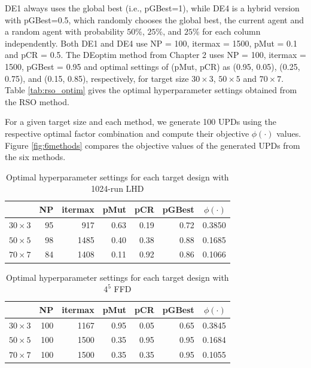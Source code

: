 \documentclass [PhD] {package/uclathes}
\begin{document}
DE1 always uses the global best (i.e., pGBest=1), while DE4 is a hybrid version with pGBest=0.5, which randomly chooses the global best, the current agent and a random agent with probability $50$\%, $25$\%, and $25$\% for each column independently. Both DE1 and DE4 use NP = 100, itermax = 1500, pMut = 0.1 and pCR = 0.5. The DEoptim method from Chapter 2 uses  NP = 100, itermax = 1500, pGBest = 0.95 and optimal settings of (pMut, pCR) as (0.95, 0.05), (0.25, 0.75), and (0.15, 0.85), respectively, for target size $30\times3$, $50\times5$ and $70\times7$. Table \ref{tab:rso_optim} gives the optimal hyperparameter settings obtained from  the RSO method.


For a given target size and each method, we generate 100 UPDs using the respective optimal factor combination and compute their objective $\phi(\cdot)$ values.  Figure \ref{fig:6methods} compares the objective values of the generated UPDs from the six methods.


\begin{table}

\caption{\label{tab:lhd_optim}Optimal hyperparameter settings for each target design with 1024-run LHD}
\centering
\begin{tabular}[t]{l|r|r|r|r|r|r}
\hline
  & NP & itermax & pMut & pCR & pGBest & $\phi(\cdot)$\\
\hline
$30\times3$ & 95 & 917 & 0.63 & 0.19 & 0.72 & 0.3850\\
\hline
$50\times5$ & 98 & 1485 & 0.40 & 0.38 & 0.88 & 0.1685\\
\hline
$70\times7$ & 84 & 1408 & 0.11 & 0.92 & 0.86 & 0.1066\\
\hline
\end{tabular}
\end{table}\begin{table}

\caption{\label{tab:grid_optim}Optimal hyperparameter settings for each target design with $4^5$ FFD}
\centering
\begin{tabular}[t]{l|r|r|r|r|r|r}
\hline
  & NP & itermax & pMut & pCR & pGBest & $\phi(\cdot)$\\
\hline
$30\times3$ & 100 & 1167 & 0.95 & 0.05 & 0.65 & 0.3845\\
\hline
$50\times5$ & 100 & 1500 & 0.35 & 0.95 & 0.95 & 0.1684\\
\hline
$70\times7$ & 100 & 1500 & 0.35 & 0.35 & 0.95 & 0.1055\\
\hline
\end{tabular}
\end{table}
\end{document}
